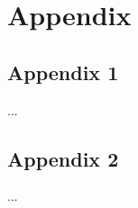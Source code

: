 %
%




\renewcommand\thesection{\Alph{section}}

\setcounter{section}{0}

\chapter*{Appendix}

\label{chap:Appendix}

\section{Appendix 1}
\label{sec:Appendix1}


...


\section{Appendix 2}
\label{sec:Appendix2}

...

\cleardoublepage